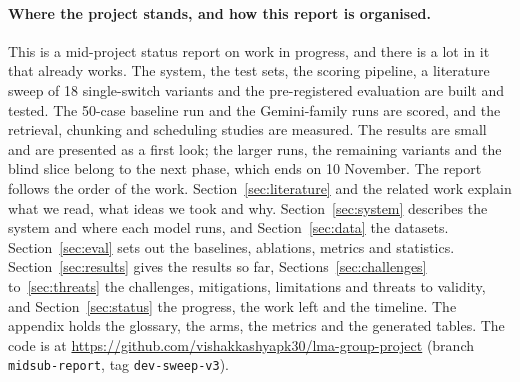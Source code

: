 \paragraph{Where the project stands, and how this report is organised.} This is a mid-project status report on work in progress, and there is a lot in it that already works. The system, the test sets, the scoring pipeline, a literature sweep of 18 single-switch variants and the pre-registered evaluation are built and tested. The 50-case baseline run and the Gemini-family runs are scored, and the retrieval, chunking and scheduling studies are measured. The results are small and are presented as a first look; the larger runs, the remaining variants and the blind slice belong to the next phase, which ends on 10 November. The report follows the order of the work. Section~\ref{sec:literature} and the related work explain what we read, what ideas we took and why. Section~\ref{sec:system} describes the system and where each model runs, and Section~\ref{sec:data} the datasets. Section~\ref{sec:eval} sets out the baselines, ablations, metrics and statistics. Section~\ref{sec:results} gives the results so far, Sections~\ref{sec:challenges} to~\ref{sec:threats} the challenges, mitigations, limitations and threats to validity, and Section~\ref{sec:status} the progress, the work left and the timeline. The appendix holds the glossary, the arms, the metrics and the generated tables. The code is at \url{https://github.com/vishakkashyapk30/lma-group-project} (branch \texttt{midsub-report}, tag \texttt{dev-sweep-v3}).

